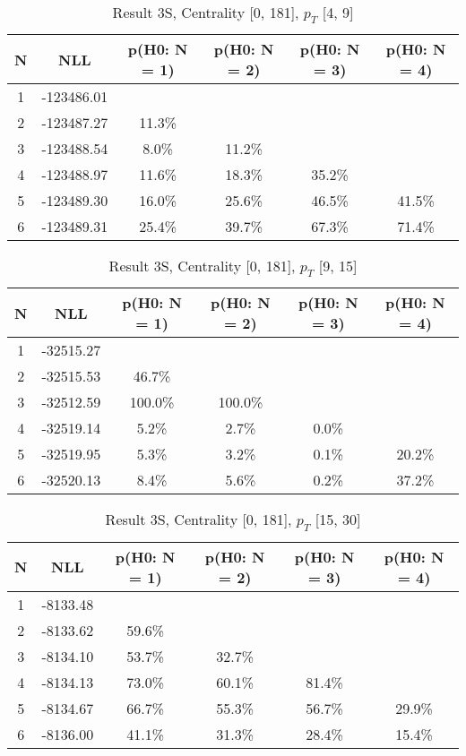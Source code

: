\begin{table}[htb]
	\begin{center}
	\caption{Result 3S, Centrality [0, 181], $p_{T}$ [4, 9]
}
{\footnotesize\renewcommand{\arraystretch}{1.4}
		\begin{tabular}{cc||cccc}
			N & NLL & p(H0: N = 1) & p(H0: N = 2) & p(H0: N = 3) & p(H0: N = 4)\\ 
		\hline
1 & -123486.01 & & & & \\
2 & -123487.27 & 11.3\% & & & \\
3 & -123488.54 & 8.0\% & 11.2\% & & \\
4 & -123488.97 & 11.6\% & 18.3\% & 35.2\% & \\
5 & -123489.30 & 16.0\% & 25.6\% & 46.5\% & 41.5\% \\
6 & -123489.31 & 25.4\% & 39.7\% & 67.3\% & 71.4\% \\
	\end{tabular}
		\label{tab:lab}
	}
	\end{center}\end{table}

\begin{table}[htb]
	\begin{center}
	\caption{Result 3S, Centrality [0, 181], $p_{T}$ [9, 15]
}
{\footnotesize\renewcommand{\arraystretch}{1.4}
		\begin{tabular}{cc||cccc}
			N & NLL & p(H0: N = 1) & p(H0: N = 2) & p(H0: N = 3) & p(H0: N = 4)\\ 
		\hline
1 & -32515.27 & & & & \\
2 & -32515.53 & 46.7\% & & & \\
3 & -32512.59 & 100.0\% & 100.0\% & & \\
4 & -32519.14 & 5.2\% & 2.7\% & 0.0\% & \\
5 & -32519.95 & 5.3\% & 3.2\% & 0.1\% & 20.2\% \\
6 & -32520.13 & 8.4\% & 5.6\% & 0.2\% & 37.2\% \\
	\end{tabular}
		\label{tab:lab}
	}
	\end{center}\end{table}

\begin{table}[htb]
	\begin{center}
	\caption{Result 3S, Centrality [0, 181], $p_{T}$ [15, 30]
}
{\footnotesize\renewcommand{\arraystretch}{1.4}
		\begin{tabular}{cc||cccc}
			N & NLL & p(H0: N = 1) & p(H0: N = 2) & p(H0: N = 3) & p(H0: N = 4)\\ 
		\hline
1 & -8133.48 & & & & \\
2 & -8133.62 & 59.6\% & & & \\
3 & -8134.10 & 53.7\% & 32.7\% & & \\
4 & -8134.13 & 73.0\% & 60.1\% & 81.4\% & \\
5 & -8134.67 & 66.7\% & 55.3\% & 56.7\% & 29.9\% \\
6 & -8136.00 & 41.1\% & 31.3\% & 28.4\% & 15.4\% \\
	\end{tabular}
		\label{tab:lab}
	}
	\end{center}\end{table}

